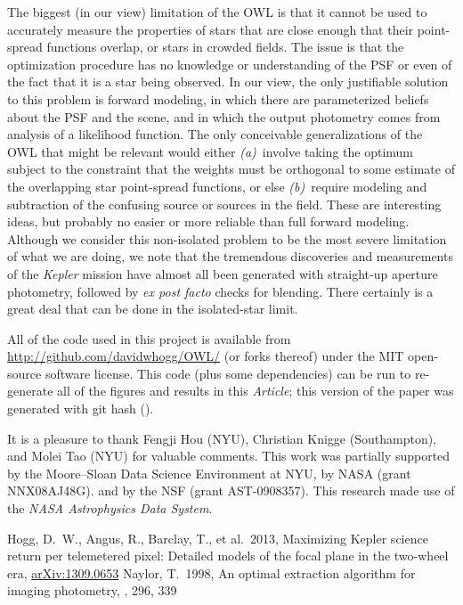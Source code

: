 \documentclass[12pt, letterpaper, preprint]{aastex}
\newcommand{\documentname}{\textsl{Article}}
\newcommand{\project}[1]{\textsl{#1}}
\newcommand{\foreign}[1]{\textsl{#1}}
\newcommand{\etal}{\foreign{et\,al.}}
\begin{document}
The biggest (in our view) limitation of the OWL is that it cannot be used
  to accurately measure the properties of stars
  that are close enough that their point-spread functions overlap,
  or stars in crowded fields.
The issue is that the optimization procedure has no knowledge or understanding
  of the PSF or even of the fact that it is a star being observed.
In our view, the only justifiable solution to this problem is forward modeling,
  in which there are parameterized beliefs about the PSF and the scene,
  and in which the output photometry comes from analysis of a likelihood function.
The only conceivable generalizations of the OWL that might be relevant would either
  \textsl{(a)}~involve taking the optimum subject to the constraint that the weights must be
  orthogonal to some estimate of the overlapping star point-spread functions, or else
  \textsl{(b)}~require modeling and subtraction of the confusing source or sources
  in the field.
These are interesting ideas,
  but probably no easier or more reliable than full forward modeling.
Although we consider this non-isolated problem to be the most severe limitation of what we are doing,
  we note that the tremendous discoveries and measurements of the \project{Kepler} mission
  have almost all been generated with straight-up aperture photometry,
  followed by \foreign{ex post facto} checks for blending.
There certainly is a great deal that can be done in the isolated-star limit.

All of the code used in this project is available
  from \url{http://github.com/davidwhogg/OWL/} (or forks thereof)
  under the MIT open-source software license.
This code (plus some dependencies) can be run
  to re-generate all of the figures and results in this \documentname;
  this version of the paper was generated with git hash
  \texttt{\githash} (\gitdate).

\acknowledgments
It is a pleasure to thank
  Fengji Hou (NYU), 
  Christian Knigge (Southampton), and
  Molei Tao (NYU)
for valuable comments.
This work was partially supported by the Moore--Sloan Data Science Environment at NYU,
  by NASA (grant NNX08AJ48G).
  and by the NSF (grant AST-0908357).
This research made use of the \project{NASA Astrophysics Data System}.

\newcommand{\arxiv}[1]{\href{http://arxiv.org/abs/#1}{arXiv:#1}}
\begin{thebibliography}{}\raggedright
\bibitem[Hogg \etal(2013)]{hoggwhitepaper}
Hogg, D.~W., Angus, R., Barclay, T., et al.\ 2013,
Maximizing Kepler science return per telemetered pixel: Detailed models of the focal plane in the two-wheel era,
\arxiv{1309.0653}
Naylor, T.\ 1998,
An optimal extraction algorithm for imaging photometry,
\mnras, 296, 339
\end{thebibliography}
\end{document}

